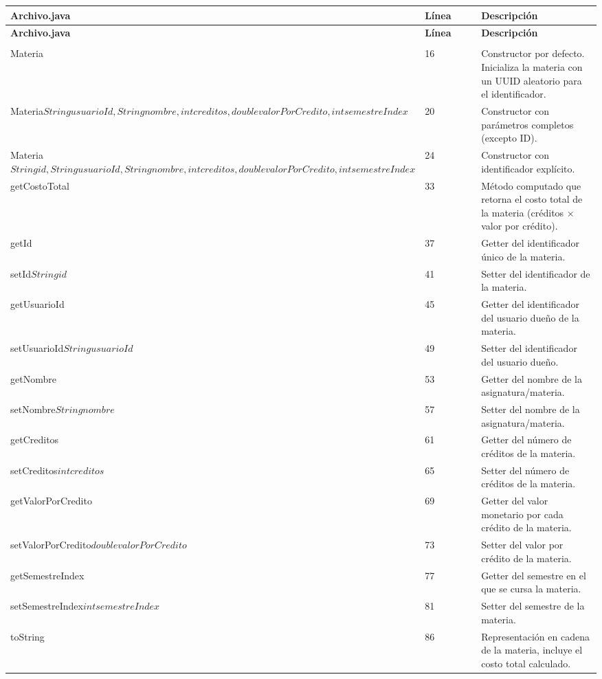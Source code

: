 \documentclass[utf8]{article}
\begin{document}
\begin{longtable}{p{0.18\linewidth}p{0.32\linewidth}p{0.5\linewidth}}
\hline
\textbf{Archivo.java} & \textbf{Línea} & \textbf{Descripción} \\ \hline
\endfirsthead
\hline
\textbf{Archivo.java} & \textbf{Línea} & \textbf{Descripción} \\ \hline
\endhead
\hline
\endfoot
\hline
\endlastfoot
\endlastfoot}
\textbf{Materia.java} & & \\ \hline
Materia\(\) & 16 & Constructor por defecto. Inicializa la materia con un UUID aleatorio para el identificador. \\
Materia\(String usuarioId, String nombre, int creditos, double valorPorCredito, int semestreIndex\) & 20 & Constructor con parámetros completos (excepto ID). \\
Materia\(String id, String usuarioId, String nombre, int creditos, double valorPorCredito, int semestreIndex\) & 24 & Constructor con identificador explícito. \\
getCostoTotal\(\) & 33 & Método computado que retorna el costo total de la materia (créditos × valor por crédito). \\
getId\(\) & 37 & Getter del identificador único de la materia. \\
setId\(String id\) & 41 & Setter del identificador de la materia. \\
getUsuarioId\(\) & 45 & Getter del identificador del usuario dueño de la materia. \\
setUsuarioId\(String usuarioId\) & 49 & Setter del identificador del usuario dueño. \\
getNombre\(\) & 53 & Getter del nombre de la asignatura/materia. \\
setNombre\(String nombre\) & 57 & Setter del nombre de la asignatura/materia. \\
getCreditos\(\) & 61 & Getter del número de créditos de la materia. \\
setCreditos\(int creditos\) & 65 & Setter del número de créditos de la materia. \\
getValorPorCredito\(\) & 69 & Getter del valor monetario por cada crédito de la materia. \\
setValorPorCredito\(double valorPorCredito\) & 73 & Setter del valor por crédito de la materia. \\
getSemestreIndex\(\) & 77 & Getter del semestre en el que se cursa la materia. \\
setSemestreIndex\(int semestreIndex\) & 81 & Setter del semestre de la materia. \\
toString\(\) & 86 & Representación en cadena de la materia, incluye el costo total calculado. \\
\end{longtable}
\end{document}
